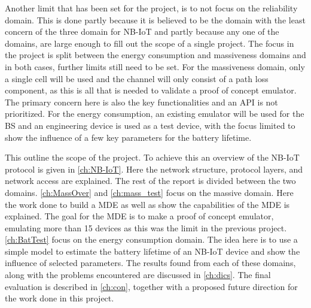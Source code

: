 Another limit that has been set for the project, is to not focus on the reliability domain. This is done partly because it is believed to be the domain with the least concern of the three domain for NB-IoT and partly because any one of the domains, are large enough to fill out the scope of a single project. The focus in the project is split between the energy consumption and massiveness domains and in both cases, further limits still need to be set. For the massiveness domain, only a single cell will be used and the channel will only consist of a path loss component, as this is all that is needed to validate a proof of concept emulator. The primary concern here is also the key functionalities and an API is not prioritized. For the energy consumption, an existing emulator will be used for the BS and an engineering device is used as a test device, with the focus limited to show the influence of a few key parameters for the battery lifetime. %

This outline the scope of the project. To achieve this an overview of the \gls{NB-IoT} protocol is given in \autoref{ch:NB-IoT}. Here the network structure, protocol layers, and network access are explained. The rest of the report is divided between the two domains. \autoref{ch:MassOver} and \autoref{ch:mass_test} focus on the massive domain. Here the work done to build a \gls{MDE} as well as show the capabilities of the \gls{MDE} is explained. The goal for the MDE is to make a proof of concept emulator, emulating more than 15 devices as this was the limit in the previous project. \autoref{ch:BatTest} focus on the energy consumption domain. The idea here is to use a simple model to estimate the battery lifetime of an NB-IoT device and show the influence of selected parameters. The results found from each of these domains, along with the problems encountered are discussed in \autoref{ch:dics}. The final evaluation is described in \autoref{ch:con}, together with a proposed future direction for the work done in this project. 


